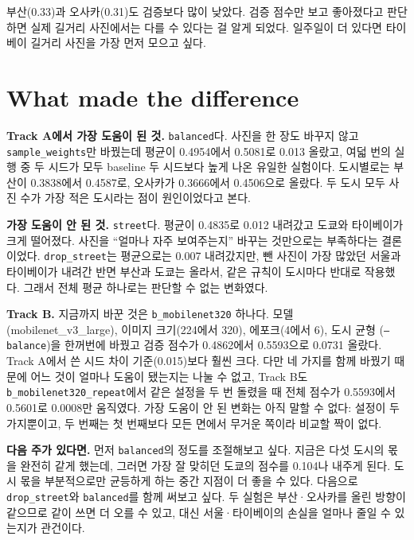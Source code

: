 \documentclass[11pt]{article}
\begin{document}
부산(0.33)과 오사카(0.31)도 검증보다 많이 낮았다. 검증 점수만 보고 좋아졌다고 판단하면
실제 길거리 사진에서는 다를 수 있다는 걸 알게 되었다. 일주일이 더 있다면 타이베이 길거리
사진을 가장 먼저 모으고 싶다.

\section*{What made the difference}

\textbf{Track A에서 가장 도움이 된 것.} \texttt{balanced}다. 사진을 한 장도 바꾸지
않고 \texttt{sample\_weights}만 바꿨는데 평균이 0.4954에서 0.5081로 0.013 올랐고,
여덟 번의 실행 중 두 시드가 모두 baseline 두 시드보다 높게 나온 유일한 실험이다.
도시별로는 부산이 0.3838에서 0.4587로, 오사카가 0.3666에서 0.4506으로 올랐다. 두
도시 모두 사진 수가 가장 적은 도시라는 점이 원인이었다고 본다.

\textbf{가장 도움이 안 된 것.} \texttt{street}다. 평균이 0.4835로 0.012 내려갔고
도쿄와 타이베이가 크게 떨어졌다. 사진을 ``얼마나 자주 보여주는지'' 바꾸는 것만으로는
부족하다는 결론이었다. \texttt{drop\_street}는 평균으로는 0.007 내려갔지만, 뺀
사진이 가장 많았던 서울과 타이베이가 내려간 반면 부산과 도쿄는 올라서, 같은 규칙이
도시마다 반대로 작용했다. 그래서 전체 평균 하나로는 판단할 수 없는 변화였다.

\textbf{Track B.} 지금까지 바꾼 것은 \texttt{b\_mobilenet320} 하나다. 모델
(mobilenet\_v3\_large), 이미지 크기(224에서 320), 에포크(4에서 6), 도시 균형
(\texttt{--balance})을 한꺼번에 바꿨고 검증 점수가 0.4862에서 0.5593으로 0.0731 올랐다.
Track A에서 쓴 시드 차이 기준(0.015)보다 훨씬 크다. 다만 네 가지를 함께 바꿨기 때문에
어느 것이 얼마나 도움이 됐는지는 나눌 수 없고, Track B도 \texttt{b\_mobilenet320\_repeat}에서
같은 설정을 두 번 돌렸을 때 전체 점수가 0.5593에서 0.5601로 0.0008만 움직였다. 가장
도움이 안 된 변화는 아직 말할 수 없다: 설정이 두 가지뿐이고, 두 번째는 첫 번째보다 모든
면에서 무거운 쪽이라 비교할 짝이 없다.

\textbf{다음 주가 있다면.} 먼저 \texttt{balanced}의 정도를 조절해보고 싶다. 지금은
다섯 도시의 몫을 완전히 같게 했는데, 그러면 가장 잘 맞히던 도쿄의 점수를 0.104나
내주게 된다. 도시 몫을 부분적으로만 균등하게 하는 중간 지점이 더 좋을 수 있다.
다음으로 \texttt{drop\_street}와 \texttt{balanced}를 함께 써보고 싶다. 두 실험은
부산·오사카를 올린 방향이 같으므로 같이 쓰면 더 오를 수 있고, 대신 서울·타이베이의
손실을 얼마나 줄일 수 있는지가 관건이다.
\end{document}
